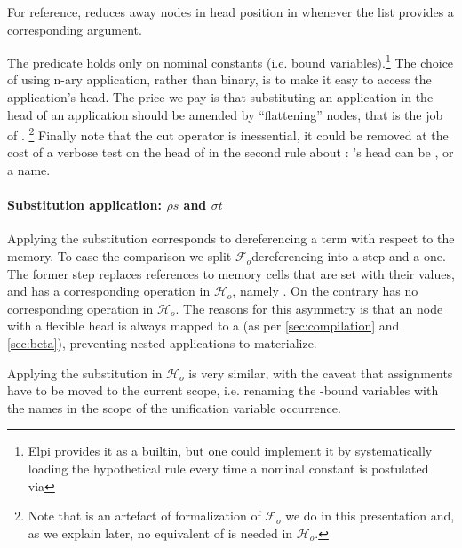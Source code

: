 \documentclass[sigconf,natbib=false,review]{acmart}
\newcommand{\Fo}{\ensuremath{\mathcal{F}_{\!o}\xspace}} %
\newcommand{\Ho}{\ensuremath{\mathcal{H}_o}\xspace}
\begin{document}
For reference,  reduces away  nodes in head
position in  whenever the list  provides a corresponding
argument.



\noindent
The  predicate holds only on nominal constants (i.e. bound
variables).\footnote{Elpi provides it as a builtin, but one could implement it by
systematically loading the hypothetical rule  every time
a nominal constant is postulated via }
The choice of using n-ary application, rather than binary, is to make it
easy to access the application's head. The price we pay is that substituting
an application in the head of an application should be amended by
``flattening''  nodes, that is the job of .
\footnote{Note that  is an artefact of formalization of \Fo{}
we do in this presentation and, as we explain later,
no equivalent of  is needed in \Ho.}
Finally note that the cut operator is inessential, it could be
removed at the cost of a verbose test on the head of 
in the second rule about : 's head
can be ,  or a name.


\paragraph{Substitution application: $\rho s$ and $\sigma t$}

Applying the substitution corresponds to dereferencing a term with respect to
the memory. To ease the comparison we split \Fo dereferencing into a
 step and a  one. The former step replaces references
to memory cells that are set with their values, and has a corresponding
operation in \Ho, namely . On the contrary 
has no corresponding operation in \Ho. The reasons for this asymmetry is
that an  node with a flexible head is always mapped
to a  (as per \cref{sec:compilation} and \cref{sec:beta}),
preventing nested applications to materialize.



\noindent
Applying the substitution in \Ho{} is very similar, with
the caveat that assignments have to be moved to the
current scope, i.e. renaming the -bound variables
with the names in the scope of the unification variable occurrence.


\end{document}
